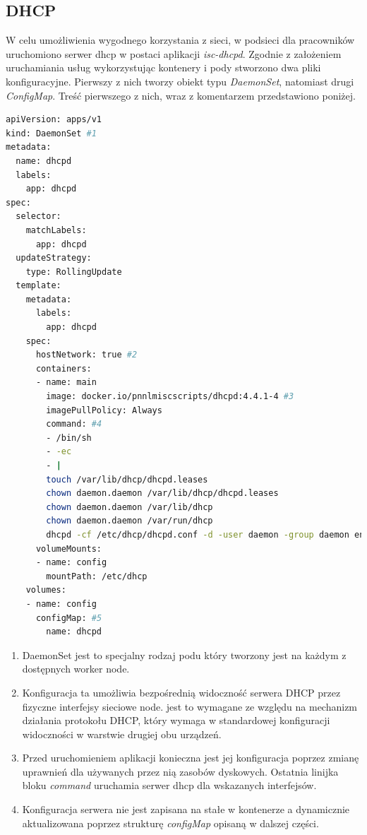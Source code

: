 \documentclass[pl,final,oneside]{mgr} %
\begin{document}
\subsection{DHCP}

W celu umożliwienia wygodnego korzystania z sieci, w podsieci dla pracowników uruchomiono serwer dhcp w postaci aplikacji \textit{isc-dhcpd}. Zgodnie z założeniem uruchamiania usług wykorzystując kontenery i pody stworzono dwa pliki konfiguracyjne. Pierwszy z nich tworzy obiekt typu \textit{DaemonSet}, natomiast drugi \textit{ConfigMap}. Treść pierwszego z nich, wraz z komentarzem przedstawiono poniżej.

\begin{lstlisting}[language=Bash]
apiVersion: apps/v1
kind: DaemonSet #1
metadata:
  name: dhcpd
  labels:
    app: dhcpd
spec:
  selector:
    matchLabels:
      app: dhcpd
  updateStrategy:
    type: RollingUpdate
  template:
    metadata:
      labels:
        app: dhcpd
    spec:
      hostNetwork: true #2
      containers:
      - name: main
        image: docker.io/pnnlmiscscripts/dhcpd:4.4.1-4 #3
        imagePullPolicy: Always
        command: #4
        - /bin/sh
        - -ec
        - |
        touch /var/lib/dhcp/dhcpd.leases
        chown daemon.daemon /var/lib/dhcp/dhcpd.leases
        chown daemon.daemon /var/lib/dhcp
        chown daemon.daemon /var/run/dhcp
        dhcpd -cf /etc/dhcp/dhcpd.conf -d -user daemon -group daemon enp7s0 enp8s0 enp9s0
      volumeMounts:
      - name: config
        mountPath: /etc/dhcp
    volumes:
    - name: config
      configMap: #5
        name: dhcpd
\end{lstlisting}

\begin{enumerate}
	\item DaemonSet jest to specjalny rodzaj podu który tworzony jest na każdym z dostępnych worker node. 
	\item Konfiguracja ta umożliwia bezpośrednią widoczność serwera DHCP przez fizyczne interfejsy sieciowe node. jest to wymagane ze względu na mechanizm działania protokołu DHCP, który wymaga w standardowej konfiguracji widoczności w warstwie drugiej obu urządzeń.
	\item Przed uruchomieniem aplikacji konieczna jest jej konfiguracja poprzez zmianę uprawnień dla używanych przez nią zasobów dyskowych. Ostatnia linijka bloku \textit{command} uruchamia serwer dhcp dla wskazanych interfejsów.
	\item Konfiguracja serwera nie jest zapisana na stałe w kontenerze a dynamicznie aktualizowana poprzez strukturę \textit{configMap} opisaną w dalszej części.
\end{enumerate}
\end{document}
